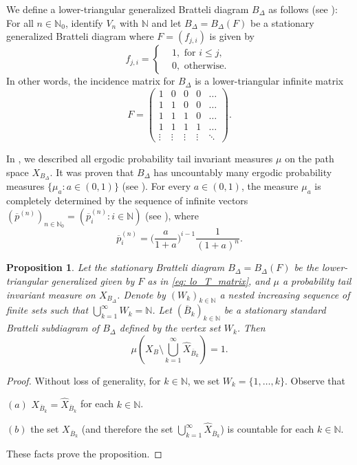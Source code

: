 \documentclass[11pt,reqno]{amsart}
\theoremstyle{definition}
\theoremstyle{remark}
\theoremstyle{plain}
\newtheorem{prop}[definition]{Proposition}
\def\ol{\overline}
\def\ov{\overline}
\def\wh{\widehat}
\newcommand{\N}{\mathbb N}
\numberwithin{equation}{section}
\begin{document}
We define a lower-triangular generalized Bratteli diagram $B_{\Delta}$ as follows (see \cite[section 8]{BezuglyiKarpelKwiatkowskiWata2024}):
For all $n \in \N_{0}$, identify $V_n$ with $\N$ and let
$B_{\Delta} = B_{\Delta}(F)$ be a stationary generalized Bratteli diagram where $F = (f_{j,i})$ is given by 
\[
f_{j,i} = 
\left\{
\begin{aligned}
& 1, \mbox{ for } i \leq j,\\
& 0, \mbox{ otherwise. }
\end{aligned}
\right.
\] 
In other words, the incidence matrix for $B_{\Delta}$ is a lower-triangular infinite matrix
\begin{equation}\label{eq: lo_T_matrix}
F = 
\begin{pmatrix}
1 & 0 & 0 & 0 &\ldots\\
1 & 1 & 0 & 0 &\ldots\\
1 & 1 & 1  & 0 &\ldots\\
1 & 1 & 1  & 1 & \ldots\\
\vdots & \vdots & \vdots & \vdots & \ddots
    \end{pmatrix}.
\end{equation}

In \cite{BezuglyiKarpelKwiatkowskiWata2024}, we described all ergodic probability tail invariant measures $\mu$ on the path space $X_{B_\Delta}$.
It was proven that  $B_\Delta$ has uncountably many ergodic probability measures $\{\mu_a : a \in (0,1)\}$ (see \cite[Theorem 8.7.]{BezuglyiKarpelKwiatkowskiWata2024}). For every $a \in (0,1)$, the measure $\mu_a$ is completely determined by the sequence of infinite vectors $(\ov{p}^{(n)})_{n \in \N_0} = (\ov{p}^{(n)}_i : i \in \N)$ (see ), where
\[
\ov{p}^{(n)}_i = \bigg(\dfrac{a}{1+a}\bigg)^{i-1} \dfrac{1}{(1+a)^n}.
\] 

\begin{prop}\label{prop meas triangle BD}
Let the stationary Bratteli diagram $B_{\Delta} = B_{\Delta} (F)$ be the lower-triangular generalized given by $F$ as in \eqref{eq: lo_T_matrix}, and $\mu$ a probability tail invariant measure 
on $X_{B_\Delta}$. Denote by $(W_k)_{k \in \N}$ a nested increasing sequence of finite sets such that $\bigcup_{k=1}^{\infty} W_k = \N$. Let $(\ol B_k)_{k \in \N}$ be a stationary standard Bratteli subdiagram of $B_{\Delta}$ defined by the vertex set $W_k$. Then
$$
\mu \left(X_B \setminus \bigcup_{k=1}^{\infty} \wh X_{\ol B_k} \right) = 1.
$$
\end{prop}

\begin{proof}
Without loss of generality, for $k \in \N$, we set $W_k = \{1, \ldots, k\}$. Observe that

$(a)$ $X_{\ov{B}_k} = \wh{X}_{\ov{B}_k}$ for each $k \in \N$.

$(b)$ the set $X_{\ov{B}_k}$ (and therefore the set 
$\bigcup_{k=1}^{\infty} \wh X_{\ov{B}_k}$)
is countable for each $k \in \N$.

These facts prove the proposition. 
\end{proof}
\end{document}
